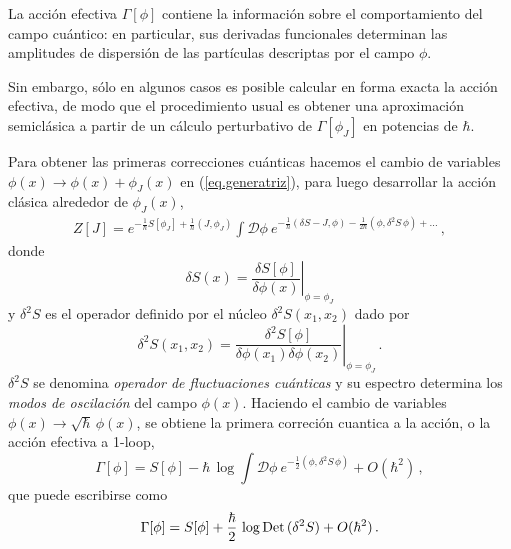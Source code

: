 {\red La acción efectiva $\Gamma[\phi]$ contiene la información sobre el comportamiento del campo cuántico: en particular, sus derivadas funcionales determinan las amplitudes de dispersión de las partículas descriptas por el campo $\phi$.}
\begin{comment}
Para demostrar esto se toma su derivada funcional evaluada en el campo medio $\phi _J $.
\begin{equation}
\frac{\delta \Gamma [ \phi _J ]}{\delta \phi _J (x) } = 
J(x) + \int dx ' \frac{\delta J [\phi _J ]}{\delta \phi _J (x) } \phi _J (x) - 
\frac{1}{Z[J]} \int dx' \frac{\delta Z[J] }{\delta J(x')} \frac{\delta J[\phi _J ]}{\delta \phi _J (x)} = J(x) \\[8pt]
\end{equation}
\end{comment}
Sin embargo, sólo en algunos casos es posible calcular en forma exacta la acción efectiva, de modo que el procedimiento usual es obtener una aproximación semiclásica a partir de un cálculo perturbativo de $\Gamma [ \phi _J]$ en potencias de $\hbar$.

Para obtener las primeras correcciones cuánticas hacemos el cambio de variables $\phi (x) \rightarrow \phi(x) + \phi _J (x) $ en (\ref{eq.generatriz}), para luego desarrollar la acción clásica alrededor de $\phi _J (x)$,
{\red \begin{equation}
\begin{array}{c}
Z[J] = e ^{- \frac{1}{\hbar} S[ \phi _J ] + \frac{1}{\hbar} (J, \phi _J )} 
\int \mathscr D \phi\ e ^{ - \frac{1}{\hbar} (\delta S  - J, \phi ) - \frac{1}{2 \hbar}  (\phi,\delta ^2 S\, \phi)+\ldots }\,,
\end{array}
\end{equation}
donde
\begin{equation}
\delta S(x) = \left. \frac{\delta S[\phi]}{ \delta \phi (x) } \right| _{\phi = \phi _J}
\end{equation}
y $\delta^2S$ es el operador definido por el núcleo $\delta ^2 S(x_1,x_2)$ dado por
\begin{equation}
		\delta ^2 S(x_1,x_2) = \left. \frac{\delta ^2 S[\phi]}{ \delta \phi (x_1) \delta \phi (x_2) } \right| _{\phi = \phi _J}\,.
\end{equation}
$\delta^2S$ se denomina {\it operador de fluctuaciones cuánticas} y su espectro determina los {\it modos de oscilación} del campo $\phi(x)$.} Haciendo el cambio de variables $\phi (x) \rightarrow \sqrt{\hbar}\, \phi (x) $, se obtiene la primera correción cuantica a la  acción, o la acción efectiva a 1-loop,
\begin{equation}
\Gamma [\phi] = S [ \phi] - 
\hbar\,\log\int \mathscr D \phi \ e ^{- \frac{1}{2}  (\phi, \delta ^2 S\, \phi) } + O(\hbar ^2)\,,
\end{equation}
que puede escribirse como
\begin{equation}\label{gama-det}
\Gamma [\phi] = S [\phi] + \frac{\hbar}{2}\, \log{\rm Det}\, ( \delta ^2 S ) +
O ( \hbar ^2 )\,.
\end{equation}

